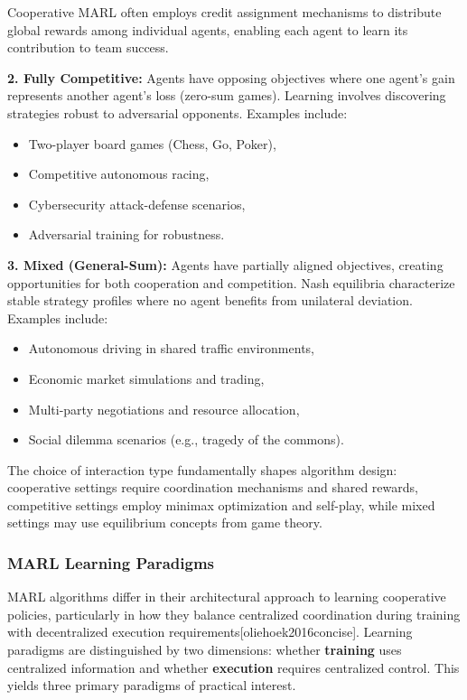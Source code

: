 Cooperative MARL often employs credit assignment mechanisms to distribute global rewards among individual agents, enabling each agent to learn its contribution to team success.

\textbf{2. Fully Competitive:} Agents have opposing objectives where one agent's gain represents another agent's loss (zero-sum games). Learning involves discovering strategies robust to adversarial opponents. Examples include:
\begin{itemize}
    \item Two-player board games (Chess, Go, Poker),
    \item Competitive autonomous racing,
    \item Cybersecurity attack-defense scenarios,
    \item Adversarial training for robustness.
\end{itemize}

\textbf{3. Mixed (General-Sum):} Agents have partially aligned objectives, creating opportunities for both cooperation and competition. Nash equilibria characterize stable strategy profiles where no agent benefits from unilateral deviation. Examples include:
\begin{itemize}
    \item Autonomous driving in shared traffic environments,
    \item Economic market simulations and trading,
    \item Multi-party negotiations and resource allocation,
    \item Social dilemma scenarios (e.g., tragedy of the commons).
\end{itemize}

The choice of interaction type fundamentally shapes algorithm design: cooperative settings require coordination mechanisms and shared rewards, competitive settings employ minimax optimization and self-play, while mixed settings may use equilibrium concepts from game theory.

\subsubsection{MARL Learning Paradigms}
\label{sec:marl_paradigms}

MARL algorithms differ in their architectural approach to learning cooperative policies, particularly in how they balance centralized coordination during training with decentralized execution requirements[oliehoek2016concise]. Learning paradigms are distinguished by two dimensions: whether \textbf{training} uses centralized information and whether \textbf{execution} requires centralized control. This yields three primary paradigms of practical interest.

